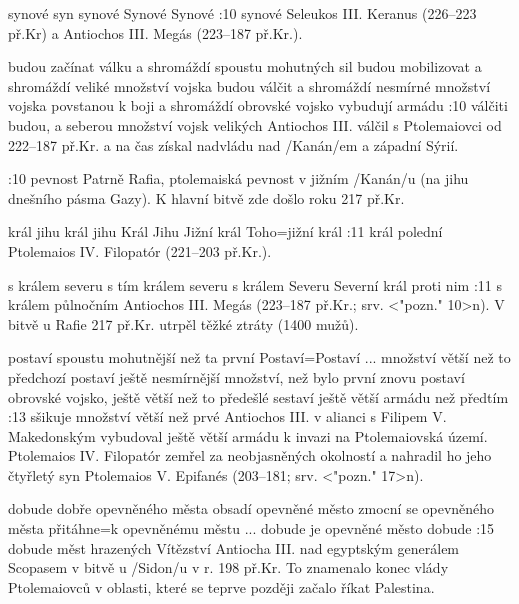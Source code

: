     {synové} %
    {syn}  %
    {synové} %
    {Synové}  %
    {Synové}  %
:10 {synové} Seleukos III. Keranus (226--223 př.Kr) a Antiochos III. Megás (223--187 př.Kr.).

    {budou začínat válku a shromáždí spoustu mohutných sil}   %
    {budou mobilizovat a shromáždí veliké množství vojska}   %
    {budou válčit a shromáždí nesmírné množství vojska}   %
    {povstanou k boji a shromáždí obrovské vojsko}   %
    {vybudují armádu}   %
:10 {válčiti budou, a seberou množství vojsk velikých}
    Antiochos III. válčil s Ptolemaiovci od 222--187 př.Kr. a na čas získal nadvládu nad \x/Kanán/em a západní Sýrií. 

:10 {pevnost} Patrně Rafia, ptolemaiská pevnost v jižním \x/Kanán/u (na jihu dnešního pásma        Gazy). K hlavní bitvě zde došlo roku 217 př.Kr.

    {král jihu}      %
    {král jihu}   %
    {Král Jihu}   %
    {Jižní král}   %
    {Toho}={jižní král}   %
:11 {král polední}  Ptolemaios IV. Filopatór (221--203 př.Kr.).
    
    {s králem severu}   %
    {s tím králem severu}   %
    {s králem Severu}   %
    {Severní král}   %
    {proti nim}   %
:11
    {s králem půlnočním}
     Antiochos III. Megás (223--187 př.Kr.; srv. <"pozn." 10>n). V bitvě u Rafie 217 př.Kr. utrpěl těžké ztráty (1400 mužů).
     
    {postaví spoustu mohutnější než ta první}   %
    {Postaví}={Postaví ... množství větší než to předchozí}   %
    {postaví ještě nesmírnější množství, než bylo první}   %
    {znovu postaví obrovské vojsko, ještě větší než to předešlé}   %
    {sestaví ještě větší armádu než předtím}   %
:13 {sšikuje množství větší než prvé}
    Antiochos III. v alianci s Filipem V. Makedonským vybudoval ještě větší armádu k invazi na Ptolemaiovská území. Ptolemaios IV. Filopatór zemřel za neobjasněných okolností a nahradil ho jeho čtyřletý syn Ptolemaios V. Epifanés (203--181; srv. <"pozn." 17>n).

    {dobude dobře opevněného města}   %
    {obsadí opevněné město}   %
    {zmocní se opevněného města}   %
    {přitáhne}={k opevněnému městu ... dobude je}   %
    {opevněné město dobude}   %
:15 {dobude měst hrazených}
    Vítězství Antiocha III. nad egyptským generálem Scopasem v bitvě u \x/Sidon/u v r. 198 př.Kr. To znamenalo konec vlády Ptolemaiovců v oblasti, které se teprve později začalo říkat Palestina.


